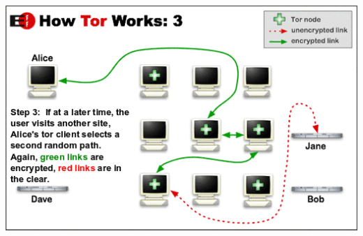\documentclass[11pt]{article}
\begin{document}
\begin{center}
\includegraphics[natwidth=510bp,natheight=326bp,width= 0.7\linewidth]{appendix/htw3.png}
\end{center}

\newpage

\nocite{*}




\end{document}
